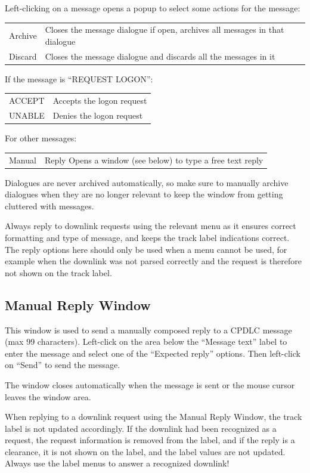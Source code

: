 \documentclass[11pt,a4paper]{memoir}
\newenvironment{Warn}
  {\begin{shaded}\marginnote{\fbox{Warning}}}
  {\end{shaded}}
\begin{document}
Left-clicking on a message opens a popup to select some actions for the message:

\begin{tabular}{l l}
    Archive & Closes the message dialogue if open, archives all messages in that dialogue\\
    Discard & Closes the message dialogue and discards all the messages in it\\
\end{tabular}

If the message is “REQUEST LOGON”:

\begin{tabular}{l l}
    ACCEPT & Accepts the logon request\\
    UNABLE & Denies the logon request\\
\end{tabular}

For other messages:

\begin{tabular}{l l}
    Manual & Reply Opens a window (see below) to type a free text reply\\
\end{tabular}

Dialogues are never archived automatically, so make sure to manually archive dialogues when they are no longer relevant to keep the window from getting cluttered with messages.

Always reply to downlink requests using the relevant menu as it ensures correct formatting and type of message, and keeps the track label indications correct. The reply options here should only be used when a menu cannot be used, for example when the downlink was not parsed correctly and the request is therefore not shown on the track label.

\subsection{Manual Reply Window}
\label{win:dlmrw}

This window is used to send a manually composed reply to a CPDLC message (max 99 characters). Left-click on the area below the “Message text” label to enter the message and select one of the “Expected reply” options. Then left-click on “Send” to send the message.

The window closes automatically when the message is sent or the mouse cursor leaves the window area.

\begin{Warn}
    When replying to a downlink request using the Manual Reply Window, the track label is not updated accordingly. If the downlink had been recognized as a request, the request information is removed from the label, and if the reply is a clearance, it is not shown on the label, and the label values are not updated. Always use the label menus to answer a recognized downlink!
\end{Warn}
\end{document}
